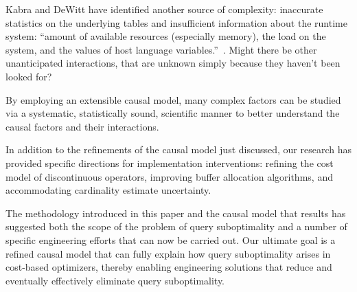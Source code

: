 \documentclass[prodmode,acmtods]{acmsmall}
\begin{document}
Kabra and
\hbox{DeWitt} have identified another source of complexity: inaccurate
statistics on the underlying tables and insufficient information about the
runtime system: ``amount of available resources (especially memory), the
load on the system, and the values of host language
variables.''~\cite[p.~106]{kabra98}.  Might there be other unanticipated
interactions, that are unknown simply because they haven't been
looked for?


By employing an extensible causal model, many complex factors can be studied
via a systematic, statistically sound, scientific manner to better
understand the causal factors and their interactions.

In addition to the refinements of the causal model just discussed, our
research has provided specific directions for implementation interventions:
refining the cost model of discontinuous operators, improving buffer
allocation algorithms, and accommodating cardinality estimate uncertainty.


The methodology introduced in this paper and the causal model that results
has suggested both the scope of the problem of query suboptimality and a
number of specific engineering efforts that can now be carried out. Our
ultimate goal is a refined causal model that can fully explain how query
suboptimality arises in cost-based optimizers, thereby enabling engineering
solutions that reduce and eventually
effectively eliminate query suboptimality.

\end{document}
